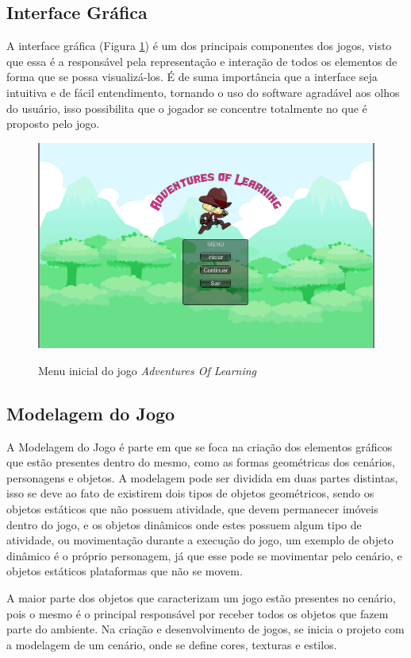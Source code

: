 \documentclass[
	12pt,				%
    oneside,			%
	a4paper,			%
	english,			%
	french,				%
	spanish,			%
	brazil,				%
	]{abntex2}
\begin{document}
		\subsection{Interface Gráfica}
			A interface gráfica (Figura \ref{fig:05}) é um dos principais componentes dos jogos, visto que essa é a responsável pela representação e interação de todos os elementos de forma que se possa visualizá-los. É de suma importância que a interface seja intuitiva e de fácil entendimento, tornando o uso do software agradável aos olhos do usuário, isso possibilita que o jogador se concentre totalmente no que é proposto pelo jogo. 
			\begin{figure}[H]
				\caption{Menu inicial do jogo \textit{Adventures Of Learning}}
				\centering
				\includegraphics[width=0.7\linewidth]{Imagens/05}
				\label{fig:05}
			\end{figure}				
				
		\subsection{Modelagem do Jogo}
		
			A Modelagem do Jogo é parte em que se foca na criação dos elementos gráficos que estão presentes dentro do mesmo, como as formas geométricas dos cenários, personagens e objetos. A modelagem pode ser dividida em duas partes distintas, isso se deve ao fato de existirem dois tipos de objetos geométricos, sendo os objetos estáticos que não possuem atividade, que devem permanecer imóveis dentro do jogo, e os objetos dinâmicos onde estes possuem algum tipo de atividade, ou movimentação durante a execução do jogo, um exemplo de objeto dinâmico é o próprio personagem, já que esse pode se movimentar pelo cenário, e objetos estáticos plataformas que não se movem.
			
			A maior parte dos objetos que caracterizam um jogo estão presentes no cenário, pois o mesmo é o principal responsável por receber todos os objetos que fazem parte do ambiente. Na criação e desenvolvimento de jogos, se inicia o projeto com a modelagem de um cenário, onde se define cores, texturas e estilos.  
				
\end{document}
